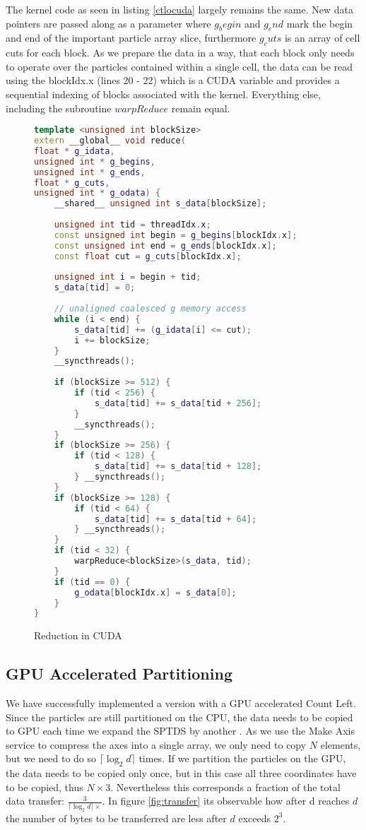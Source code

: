 \documentclass[]{article}
\begin{document}
The kernel code as seen in listing \ref{ctlocuda} largely remains the same. New data pointers are passed along as a parameter where $g_begin$ and $g_end$ mark the begin and end of the important particle array slice, furthermore $g_cuts$ is an array of cell cuts for each block. As we prepare the data in a way, that each block only needs to operate over the particles contained within a single cell, the data can be read using the blockIdx.x (lines 20 - 22) which is a CUDA variable and provides a sequential indexing of blocks associated with the kernel. Everything else, including the subroutine $warpReduce$ remain equal. 

\begin{figure}[H]
	\begin{lstlisting}[language=c++, caption=Kernel Optimized GPU Count Left, label = ctlocuda]
template <unsigned int blockSize>
extern __global__ void reduce(
float * g_idata,
unsigned int * g_begins,
unsigned int * g_ends,
float * g_cuts,
unsigned int * g_odata) {
	__shared__ unsigned int s_data[blockSize];
	
	unsigned int tid = threadIdx.x;
	const unsigned int begin = g_begins[blockIdx.x];
	const unsigned int end = g_ends[blockIdx.x];
	const float cut = g_cuts[blockIdx.x];
	
	unsigned int i = begin + tid;
	s_data[tid] = 0;
	
	// unaligned coalesced g memory access
	while (i < end) {
		s_data[tid] += (g_idata[i] <= cut);
		i += blockSize;
	}
	__syncthreads();
	
	if (blockSize >= 512) {
		if (tid < 256) {
			s_data[tid] += s_data[tid + 256];
		}
		__syncthreads();
	}
	if (blockSize >= 256) {
		if (tid < 128) {
			s_data[tid] += s_data[tid + 128];
		} __syncthreads();
	}
	if (blockSize >= 128) {
		if (tid < 64) {
			s_data[tid] += s_data[tid + 64];
		} __syncthreads();
	}
	if (tid < 32) {
		warpReduce<blockSize>(s_data, tid);
	}
	if (tid == 0) {
		g_odata[blockIdx.x] = s_data[0];
	}
}
	\end{lstlisting}
	\caption{Reduction in CUDA}
	\label{cuda:reduction2}
\end{figure}

\subsection{GPU Accelerated Partitioning}

We have successfully implemented a version with a GPU accelerated Count Left. Since the particles are still partitioned on the CPU, the data needs to be copied to GPU each time we expand the SPTDS by another . As we use the Make Axis service to compress the axes into a single array, we only need to copy $N$ elements, but we need to do so $\lceil \log_2 d \rceil$ times. 
If we partition the particles on the GPU, the data needs to be copied only once, but in this case all three coordinates have to be copied, thus $
N \times 3$. Nevertheless this corresponds a fraction of the total data transfer: $\frac{3}{\lceil \log_2 d \rceil \times}$. In figure \ref{fig:transfer} its observable how after d reaches $d$ the number of bytes to be transferred are less after $d$ exceeds $2^3$.
\end{document}
